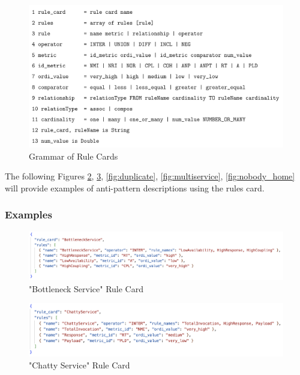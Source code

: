 \documentclass[12pt, times]{article}
\begin{document}
	\begin{figure}[h]
		\centering
		\includegraphics[scale=0.8]{rules}
		\caption{Grammar of Rule Cards}
		\label{fig:rules}
	\end{figure}
	
	The following Figures \ref{fig:bottleneck}, \ref{fig:chatty}, \ref{fig:duplicate}, \ref{fig:multiservice}, \ref{fig:nobody_home}  will provide examples of anti-pattern descriptions using the rules card. 
	
	\subsubsection{Examples}
	\label{sec:examples}
	
	\begin{figure}[h]
		\centering
		\includegraphics[scale=0.6]{bottleneck}
		\caption{"Bottleneck Service" Rule Card}
		\label{fig:bottleneck}
	\end{figure}

	\begin{figure}[h]
		\centering
		\includegraphics[scale=0.6]{chatty}
		\caption{"Chatty Service" Rule Card}
		\label{fig:chatty}
	\end{figure}	
\end{document}
